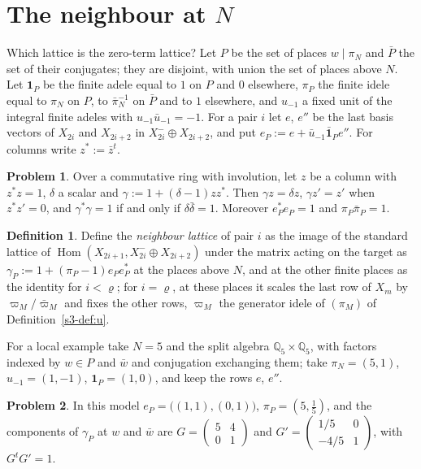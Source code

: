 \documentclass[reqno]{amsart}
\theoremstyle{definition}
\newtheorem{problem}{Problem}[section]
\newtheorem{definition}{Definition}[section]
\theoremstyle{plain}
\newcommand{\Q}{\mathbb{Q}}
\newcommand{\Hom}{\operatorname{Hom}}
\begin{document}
\section{The neighbour at \texorpdfstring{\(N\)}{N}}\label{sec:neighbour}

Which lattice is the zero-term lattice?  Let \(P\) be the set of places \(w\mid\pi_N\) and \(\bar P\) the set of their conjugates; they are disjoint, with union the set of places above \(N\).  Let \(\mathbf 1_P\) be the finite adele equal to \(1\) on \(P\) and \(0\) elsewhere, \(\pi_P\) the finite idele equal to \(\pi_N\) on \(P\), to \(\bar\pi_N^{-1}\) on \(\bar P\) and to \(1\) elsewhere, and \(u_{-1}\) a fixed unit of the integral finite adeles with \(u_{-1}\bar u_{-1}=-1\).  For a pair \(i\) let \(e\), \(e''\) be the last basis vectors of \(X_{2i}\) and \(X_{2i+2}\) in \(X_{2i}^-\oplus X_{2i+2}\), and put \(e_P:=e+\bar u_{-1}\bar{\mathbf 1}_Pe''\).  For columns write \(z^*:=\bar z^t\).

\begin{problem}\label{pr:axis}
Over a commutative ring with involution, let \(z\) be a column with \(z^*z=1\), \(\delta\) a scalar and \(\gamma:=1+(\delta-1)zz^*\).  Then \(\gamma z=\delta z\), \(\gamma z'=z'\) when \(z^*z'=0\), and \(\gamma^*\gamma=1\) if and only if \(\delta\bar\delta=1\).  Moreover \(e_P^*e_P=1\) and \(\pi_P\bar\pi_P=1\).
\end{problem}

\begin{definition}\label{def:neighbour}
Define the \emph{neighbour lattice} of pair \(i\) as the image of the standard lattice of \(\Hom(X_{2i+1},X_{2i}^-\oplus X_{2i+2})\) under the matrix acting on the target as \(\gamma_P:=1+(\pi_P-1)e_Pe_P^*\) at the places above \(N\), and at the other finite places as the identity for \(i<\varrho\); for \(i=\varrho\), at these places it scales the last row of \(X_{m}\) by \(\varpi_M/\bar\varpi_M\) and fixes the other rows, \(\varpi_M\) the generator idele of \((\pi_M)\) of Definition~\ref{s3-def:u}.
\end{definition}

For a local example take \(N=5\) and the split algebra \(\Q_5\times\Q_5\), with factors indexed by \(w\in P\) and \(\bar w\) and conjugation exchanging them; take \(\pi_N=(5,1)\), \(u_{-1}=(1,-1)\), \(\mathbf 1_P=(1,0)\), and keep the rows \(e\), \(e''\).

\begin{problem}\label{pr:split-neighbour}
In this model \(e_P=\bigl((1,1),(0,1)\bigr)\), \(\pi_P=(5,\tfrac15)\), and the components of \(\gamma_P\) at \(w\) and \(\bar w\) are \(G=\left(\begin{smallmatrix}5&4\\0&1\end{smallmatrix}\right)\) and \(G'=\left(\begin{smallmatrix}1/5&0\\-4/5&1\end{smallmatrix}\right)\), with \(G^tG'=1\).
\end{problem}
\end{document}

